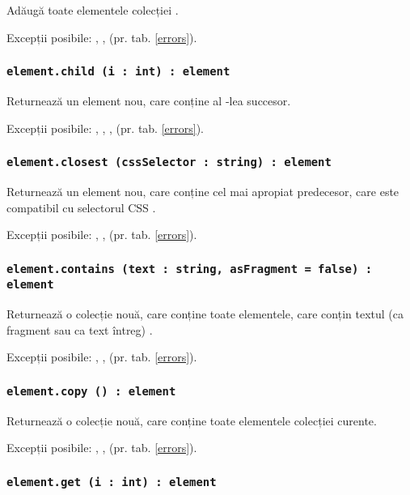 Adăugă toate elementele colecției .

Excepții posibile: , ,  (pr. tab. \ref{errors}).

\subsubsection{\lstinline|element.child (i : int) : element|}

Returnează un element nou, care conține al -lea succesor.

Excepții posibile: , , ,  (pr. tab. \ref{errors}).

\subsubsection{\lstinline|element.closest (cssSelector : string) : element|}

Returnează un element nou, care conține cel mai apropiat predecesor, care este compatibil cu selectorul CSS .

Excepții posibile: , ,  (pr. tab. \ref{errors}).

\subsubsection{\lstinline|element.contains (text : string, asFragment = false) : element|}

Returnează o colecție nouă, care conține toate elementele, care conțin textul (ca fragment sau ca text întreg) .

Excepții posibile: , ,  (pr. tab. \ref{errors}).

\subsubsection{\lstinline|element.copy () : element|}

Returnează o colecție nouă, care conține toate elementele colecției curente.

Excepții posibile: , ,  (pr. tab. \ref{errors}).

\subsubsection{\lstinline|element.get (i : int) : element|}

